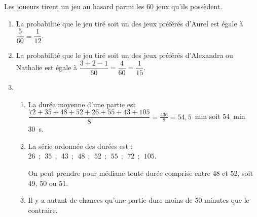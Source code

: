 
\medskip

%
%
%

Les joueurs tirent un jeu au hasard parmi les 60 jeux qu'ils possèdent.

\medskip

\begin{enumerate}
\item %
La probabilité que le jeu tiré soit un des jeux préférés d'Aurel est égale à $\dfrac{5}{60} = \dfrac{1}{12}$.
\item %
La probabilité que le jeu tiré soit un des jeux préférés d'Alexandra ou Nathalie est égale à $\dfrac{3 + 2 - 1}{60} = \dfrac{4}{60} = \dfrac{1}{15}$.
\item %

	\begin{enumerate}
		\item %
La durée moyenne d'une partie est $\dfrac{72+35+48+52+26+55+43+105}{8} = \frac{436}{8} = 54,5$~min soit 54~min 30~s.
		\item %
La série ordonnée des durées est : $26~~;~~35~~;~~43~~;~~48~~;~~52~~;~~55~~;~~72~~;~~105$.

On peut prendre pour médiane toute durée comprise entre 48 et 52, soit 49, 50 ou 51.
		\item %
Il y a autant de chances qu'une partie dure moins de 50 minutes que le contraire.
	\end{enumerate}
\end{enumerate}

\vspace{0,5cm}

